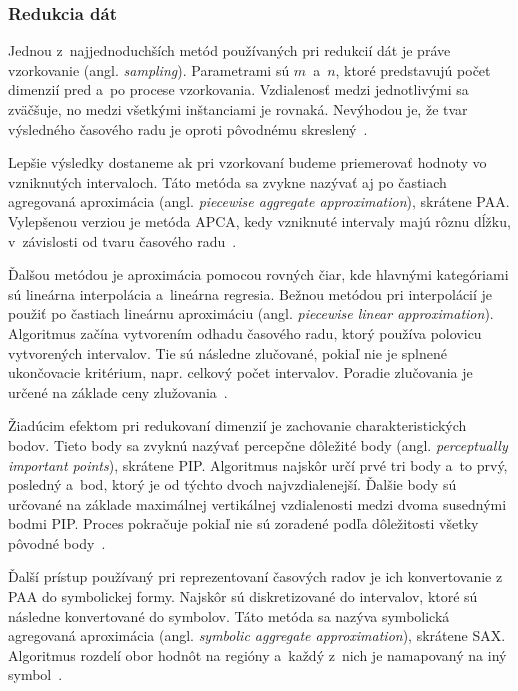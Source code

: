 \documentclass[a4paper,twoside,slovak,12pt,appendix]{article}
\begin{document}
\subsubsection{Redukcia dát}
Jednou z~najjednoduchších metód používaných pri redukcií dát je práve
vzorkovanie (angl. \textit{sampling}). Parametrami sú $m$~a~$n$, ktoré
predstavujú počet dimenzií pred a~po procese vzorkovania. Vzdialenosť medzi
jednotlivými sa zväčšuje, no medzi všetkými inštanciami je rovnaká. Nevýhodou
je, že tvar výsledného časového radu je oproti pôvodnému skreslený~\cite{Fu2011}.

Lepšie výsledky dostaneme ak pri vzorkovaní budeme priemerovať hodnoty vo
vzniknutých intervaloch. Táto metóda sa zvykne nazývať aj po častiach agregovaná
aproximácia (angl. \textit{piecewise aggregate approximation}), skrátene PAA.
Vylepšenou verziou je metóda APCA, kedy vzniknuté intervaly majú rôznu dĺžku,
	v~závislosti od tvaru časového radu~\cite{Keogh2002}.

Ďalšou metódou je aproximácia pomocou rovných čiar, kde hlavnými kategóriami sú
lineárna interpolácia a~lineárna regresia. Bežnou metódou pri interpolácií je
použiť po častiach lineárnu aproximáciu (angl. \textit{piecewise linear
approximation}). Algoritmus začína vytvorením odhadu časového radu, ktorý
používa polovicu vytvorených intervalov. Tie sú následne zlučované, pokiaľ nie
je splnené ukončovacie kritérium, napr. celkový počet intervalov. Poradie
zlučovania je určené na základe ceny zlužovania~\cite{Fu2011}.

Žiadúcim efektom pri redukovaní dimenzií je zachovanie charakteristických bodov.
Tieto body sa zvyknú nazývať percepčne dôležité body (angl. \textit{perceptually
important points}), skrátene PIP. Algoritmus najskôr určí prvé tri body a~to
prvý, posledný a~bod, ktorý je od týchto dvoch najvzdialenejší. Ďalšie body sú
určované na základe maximálnej vertikálnej vzdialenosti medzi dvoma susednými
bodmi PIP. Proces pokračuje pokiaľ nie sú zoradené podľa dôležitosti všetky
pôvodné body~\cite{Fu2011}.

Ďalší prístup používaný pri reprezentovaní časových radov je ich konvertovanie
z PAA do symbolickej formy. Najskôr sú diskretizované do intervalov, ktoré sú
následne konvertované do symbolov. Táto metóda sa nazýva symbolická agregovaná
aproximácia (angl. \textit{symbolic aggregate approximation}), skrátene SAX.
Algoritmus rozdelí obor hodnôt na regióny a~každý z~nich je namapovaný na iný
symbol~\cite{Fu2011}.
\end{document}
